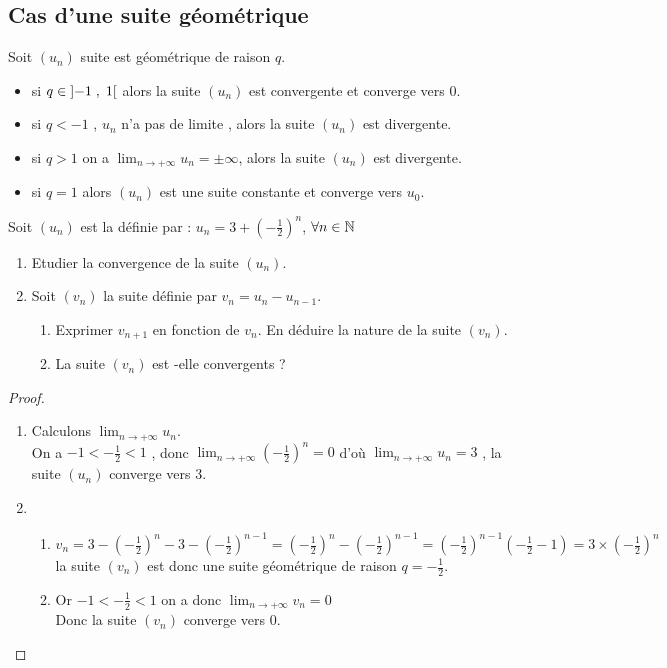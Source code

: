  \subsection*{Cas d'une suite géométrique} 
 Soit $(u_{n})$ suite est géométrique de raison $ q $.
 \begin{itemize}
 \item si $ q\in\left]-1 \;,\; 1\right[ $ alors la suite $(u_{n})$ est convergente et converge vers $ 0 $.
 \item si $ q< -1  $ , $u_{n}$ n'a pas de limite ,  alors la suite $(u_{n})$ est divergente.
 \item si $ q >1  $ $  $on a $ \displaystyle \lim_{n \to  +\infty} u_{n}= \pm\infty $, alors la suite $(u_{n})$ est divergente.
\item si $ q=1  $ alors $(u_{n})$  est une suite constante et converge vers $u_{0}$.
 \end{itemize}
\begin{exercice}
Soit $(u_{n})$ est la définie par : $ u_{n}=3+(-\frac{1}{2})^{n} $, $ \forall n\in\mathbb{N} $
 \begin{enumerate}
 \item Etudier la convergence de la suite $(u_{n})$.
 \item Soit $(v_{n})$ la suite définie par $ v_{n}=u_{n}-u_{n-1} $.
 \begin{enumerate}
 \item Exprimer $v_{n+1}$ en fonction de $ v_{n} $. En déduire la nature de la suite  $(v_{n})$.
 \item La suite  $(v_{n})$ est -elle convergents ?
 \end{enumerate}
 \end{enumerate}
 \end{exercice}
 \begin{proof}
 \begin{enumerate}
 \item Calculons $ \displaystyle \lim_{n \to  +\infty} u_{n} $.\\
 On a $ -1< -\frac{1}{2}< 1 $ , donc $\displaystyle \lim_{n \to  +\infty}(-\frac{1}{2})^{n}=0$ d'où $ \displaystyle \lim_{n \to  +\infty} u_{n}=3 $ , la suite $(u_{n})$ converge vers $3.$
 \item 
 \begin{enumerate}
 \item $ v_{n}= 3-(-\frac{1}{2})^{n}-3-(-\frac{1}{2})^{n-1}= (-\frac{1}{2})^{n}-(-\frac{1}{2})^{n-1} = (-\frac{1}{2})^{n-1}(-\frac{1}{2}-1) =3\times(-\frac{1}{2})^{n}$ 
 la suite $ (v_{n}) $ est donc une suite géométrique de raison $ q=-\frac{1}{2} $.
 \item Or $ -1< -\frac{1}{2}< 1 $ on a donc $ \displaystyle \lim_{n \to  +\infty} v_{n}=0 $ \\
 Donc la suite $ (v_{n}) $ converge vers $ 0. $
 \end{enumerate}
 \end{enumerate}
  \end{proof}
